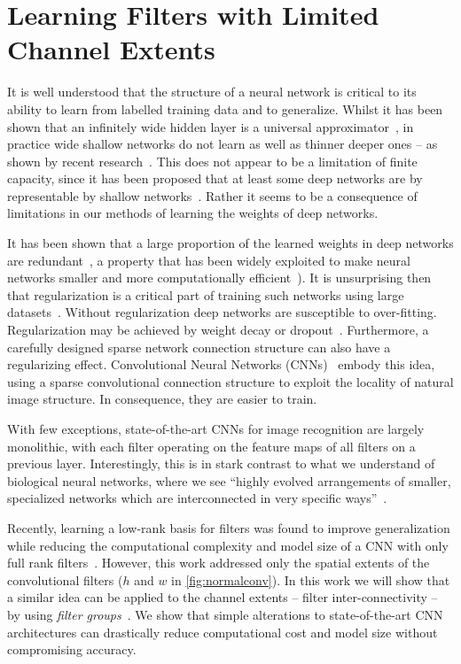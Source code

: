 \documentclass[thesis]{subfiles}
\begin{document}
	
	\chapter{Learning Filters with Limited Channel Extents}
	\label{deeproots}
	It is well understood that the structure of a neural network is critical to its ability to learn from labelled training data and to generalize. Whilst it has been shown that an infinitely wide hidden layer is a universal approximator~\citep{hornik89a}, in practice wide shallow networks do not learn as well as thinner deeper ones -- as shown by recent research~\citep{Krizhevsky2012,Szegedy2014going,Simonyan2014verydeep,He2015}.
	This does not appear to be a limitation of finite capacity, since it has been proposed that at least some deep networks are by representable by shallow networks~\citep{Ba2013dothey}. Rather it seems to be a consequence of limitations in our methods of learning the weights of deep networks.
	
	It has been shown that a large proportion of the learned weights in deep networks are redundant~\citep{Denil2013predicting}, a property that has been widely exploited to make neural networks smaller and more computationally efficient~\citep{Szegedy2014going,Denton2014efficient}). It is unsurprising then that regularization is a critical part of training such networks using large datasets~\citep{Krizhevsky2012}. Without regularization deep networks are susceptible to over-fitting. Regularization may be achieved by weight decay or dropout~\cite{Hinton2012}. Furthermore, a carefully designed sparse network connection structure can also have a regularizing effect. Convolutional Neural Networks (CNNs)~\citep{Fuk80,Lecun1998} embody this idea, using a sparse convolutional connection structure to exploit the locality of natural image structure. In consequence, they are easier to train.
	
	With few exceptions, state-of-the-art CNNs for image recognition are largely monolithic, with each filter operating on the feature maps of all filters on a previous layer. Interestingly, this is in stark contrast to what we understand of biological neural networks, where we see ``highly evolved arrangements of smaller, specialized networks which are interconnected in very specific ways''~\citep{minsky1988perceptrons}.
	
	Recently, learning a low-rank basis for filters was found to improve generalization while reducing the computational complexity and model size of a CNN with only full rank filters~\citep{Ioannou2016}. However, this work addressed only the spatial extents of the convolutional filters (\ie $h$ and $w$ in \cref{fig:normalconv}). In this work we will show that a similar idea can be applied to the channel extents -- \ie filter inter-connectivity -- by using \emph{filter groups}~\citep{Krizhevsky2012}. We show that simple alterations to state-of-the-art CNN architectures can drastically reduce computational cost and model size without compromising accuracy.
	
\end{document}
